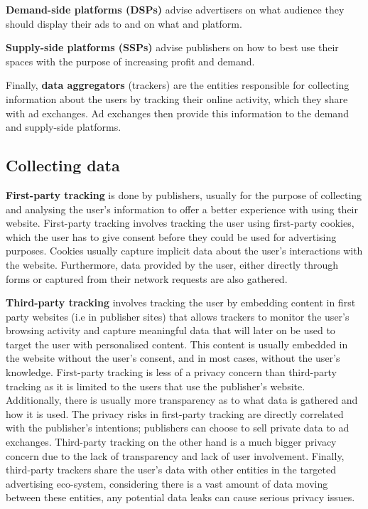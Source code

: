 \documentclass{l4proj}
\begin{document}
\textbf{Demand-side platforms (DSPs)} advise advertisers on what audience they should display their ads to and on what and platform. 

\textbf{Supply-side platforms (SSPs)} advise publishers on how to best use their spaces with the purpose of increasing profit and demand. 

Finally, \textbf{data aggregators} (trackers) are the entities responsible for collecting information about the users by tracking their online activity, which they share with ad exchanges. Ad exchanges then provide this information to the demand and supply-side platforms.

\subsection{Collecting data}
\textbf{First-party tracking} is done by publishers, usually for the purpose of collecting and analysing the user's information to offer a better experience with using their website. First-party tracking involves tracking the user using first-party cookies, which the user has to give consent before they could be used for advertising purposes. Cookies usually capture implicit data about the user's interactions with the website. Furthermore, data provided by the user, either directly through forms or captured from their network requests are also gathered.

\textbf{Third-party tracking} involves tracking the user by embedding content in first party websites (i.e in publisher sites) that allows trackers to monitor the user's browsing activity and capture meaningful data that will later on be used to target the user with personalised content. This content is usually embedded in the website without the user's consent, and in most cases, without the user's knowledge.
First-party tracking is less of a privacy concern than third-party tracking as it is limited to the users that use the publisher's website. Additionally, there is usually more transparency as to what data is gathered and how it is used. The privacy risks in first-party tracking are directly correlated with the publisher's intentions; publishers can choose to sell private data to ad exchanges. Third-party tracking on the other hand is a much bigger privacy concern due to the lack of transparency and lack of user involvement. Finally, third-party trackers share the user's data with other entities in the targeted advertising eco-system, considering there is a vast amount of data moving between these entities, any potential data leaks can cause serious privacy issues. 
\end{document}

